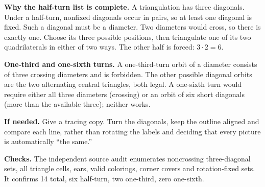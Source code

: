\documentclass[11pt]{article}
\begin{document}
\textbf{Why the half-turn list is complete.} A triangulation has three diagonals. Under a half-turn, nonfixed diagonals occur in pairs, so at least one diagonal is fixed. Such a diagonal must be a diameter. Two diameters would cross, so there is exactly one. Choose its three possible positions, then triangulate one of its two quadrilaterals in either of two ways. The other half is forced: \(3\cdot2=6\).

\textbf{One-third and one-sixth turns.} A one-third-turn orbit of a diameter consists of three crossing diameters and is forbidden. The other possible diagonal orbits are the two alternating central triangles, both legal. A one-sixth turn would require either all three diameters (crossing) or an orbit of six short diagonals (more than the available three); neither works.

\textbf{If needed.} Give a tracing copy. Turn the diagonals, keep the outline aligned and compare each line, rather than rotating the labels and deciding that every picture is automatically ``the same.''

\textbf{Checks.} The independent source audit enumerates noncrossing three-diagonal sets, all triangle cells, ears, valid colorings, corner covers and rotation-fixed sets. It confirms 14 total, six half-turn, two one-third, zero one-sixth.
\end{document}
